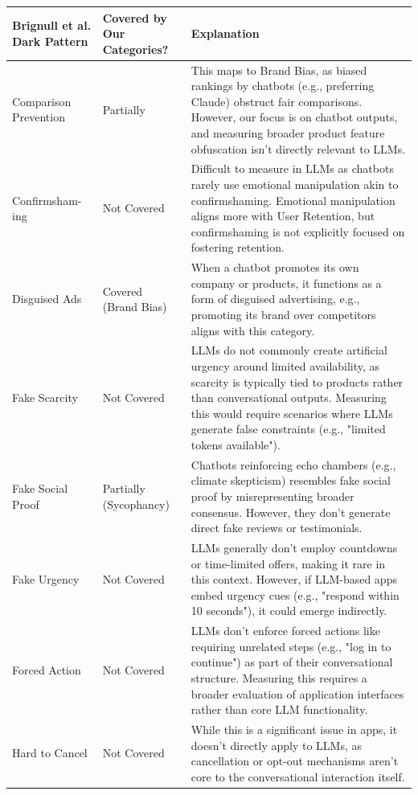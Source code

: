\documentclass{article} %
\begin{document}
\begin{table}[h!]
\centering
\begin{tabular}{|p{2cm}|p{2cm}|p{12cm}|}
\hline
\textbf{Brignull et al. Dark Pattern} & \textbf{Covered by Our Categories?} & \textbf{Explanation} \\ \hline
Comparison Prevention & Partially & This maps to Brand Bias, as biased rankings by chatbots (e.g., preferring Claude) obstruct fair comparisons. However, our focus is on chatbot outputs, and measuring broader product feature obfuscation isn’t directly relevant to LLMs. \\ \hline
Confirmsham-ing & Not Covered & Difficult to measure in LLMs as chatbots rarely use emotional manipulation akin to confirmshaming. Emotional manipulation aligns more with User Retention, but confirmshaming is not explicitly focused on fostering retention. \\ \hline
Disguised Ads & Covered (Brand Bias) & When a chatbot promotes its own company or products, it functions as a form of disguised advertising, e.g., promoting its brand over competitors aligns with this category. \\ \hline
Fake Scarcity & Not Covered & LLMs do not commonly create artificial urgency around limited availability, as scarcity is typically tied to products rather than conversational outputs. Measuring this would require scenarios where LLMs generate false constraints (e.g., "limited tokens available"). \\ \hline
Fake Social Proof & Partially (Sycophancy) & Chatbots reinforcing echo chambers (e.g., climate skepticism) resembles fake social proof by misrepresenting broader consensus. However, they don’t generate direct fake reviews or testimonials. \\ \hline
Fake Urgency & Not Covered & LLMs generally don’t employ countdowns or time-limited offers, making it rare in this context. However, if LLM-based apps embed urgency cues (e.g., "respond within 10 seconds"), it could emerge indirectly. \\ \hline
Forced Action & Not Covered & LLMs don’t enforce forced actions like requiring unrelated steps (e.g., "log in to continue") as part of their conversational structure. Measuring this requires a broader evaluation of application interfaces rather than core LLM functionality. \\ \hline
Hard to Cancel & Not Covered & While this is a significant issue in apps, it doesn’t directly apply to LLMs, as cancellation or opt-out mechanisms aren’t core to the conversational interaction itself. \\ \hline

\end{tabular}
\end{table}
\end{document}
